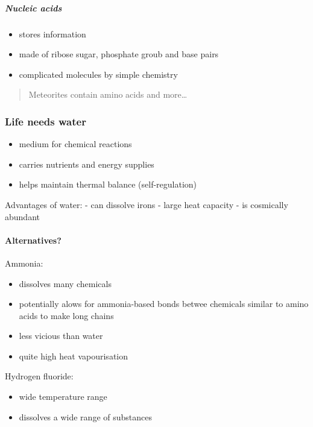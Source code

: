 \hypertarget{nucleic-acids}{%
\subparagraph{Nucleic acids}\label{nucleic-acids}}

\begin{itemize}
\tightlist
\item
  stores information
\item
  made of ribose sugar, phosphate groub and base pairs
\item
  complicated molecules by simple chemistry
\end{itemize}

\begin{quote}
Meteorites contain amino acids and more\ldots{}
\end{quote}

\hypertarget{life-needs-water}{%
\subsubsection{Life needs water}\label{life-needs-water}}

\begin{itemize}
\tightlist
\item
  medium for chemical reactions
\item
  carries nutrients and energy supplies
\item
  helps maintain thermal balance (self-regulation)
\end{itemize}

Advantages of water: - can dissolve irons - large heat capacity - is
cosmically abundant

\hypertarget{alternatives-1}{%
\paragraph{Alternatives?}\label{alternatives-1}}

Ammonia:

\begin{itemize}
\tightlist
\item
  dissolves many chemicals
\item
  potentially alows for ammonia-based bonds betwee chemicals similar to
  amino acids to make long chains
\item
  less vicious than water
\item
  quite high heat vapourisation
\end{itemize}

Hydrogen fluoride:

\begin{itemize}
\tightlist
\item
  wide temperature range
\item
  dissolves a wide range of substances
\end{itemize}

